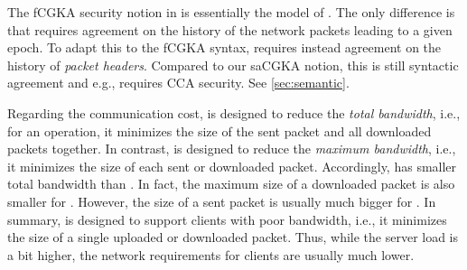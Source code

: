 The fCGKA security notion in \cite{hashimoto2021cmpke} is essentially the model of \cite{EPRINT:AlwJosMul20}. The only difference is that \cite{EPRINT:AlwJosMul20} requires agreement on the history of the network packets leading to a given epoch. To adapt this to the fCGKA syntax, \cite{hashimoto2021cmpke} requires instead agreement on the history of \emph{packet headers}. Compared to our saCGKA notion, this is still syntactic agreement and e.g., requires CCA security. See \cref{sec:semantic}.

Regarding the communication cost, \protCMPKE is designed to reduce the \emph{total bandwidth}, i.e., for an operation, it minimizes the size of the sent packet and all downloaded packets together. In contrast, \saik is designed to reduce the \emph{maximum bandwidth}, i.e., it minimizes the size of each sent or downloaded packet.
Accordingly, \protCMPKE has smaller total bandwidth than \saik. In fact, the maximum size of a downloaded packet is also smaller for \protCMPKE. However, the size of a sent packet is usually much bigger for \protCMPKE.
In summary, \saik is designed to support clients with poor bandwidth, i.e., it minimizes the size of a single uploaded or downloaded packet. Thus, while the server load is a bit higher, the network requirements for clients are usually much lower.



